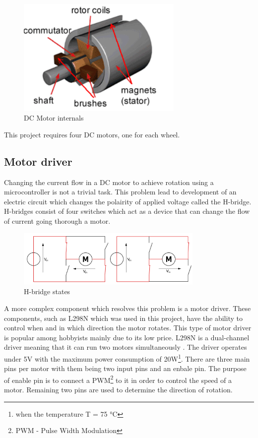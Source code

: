 \begin{figure}[htbp]
    \centerline{\includegraphics[width=8cm]{Images/DC.png}}
    \caption{DC Motor internals}
    \label{fig3}
\end{figure}

This project requires four DC motors, one for each wheel.

\subsection{Motor driver}

Changing the current flow in a DC motor to achieve rotation using a microcontroller is not a trivial task. This problem lead to development of an electric circuit which changes the polairity of applied voltage called the H-bridge. H-bridges consist of four switches which act as a device that can change the flow of current going thorough a motor.

\begin{figure}[htbp]
    \centerline{\includegraphics[width=9cm]{Images/H-Bridge.png}}
    \caption{H-bridge states}
    \label{fig4}
\end{figure}

A more complex component which resolves this problem is a motor driver. These components, such as L298N which was used in this project, have the ability to control when and in which direction the motor rotates. This type of motor driver is popular among hobbyists mainly due to its low price. L298N is a dual-channel driver meaning that it can run two motors simultaneously . The driver operates under 5V with the maximum power consumption of 20W\footnote{when the temperature T = 75 °C}. There are three main pins per motor with them being two input pins and an enbale pin. The purpose of enable pin is to connect a PWM\footnote{PWM - Pulse Width Modulation} to it in order to control the speed of a motor. Remaining two pins are used to determine the direction of rotation.\cite{L298N}

